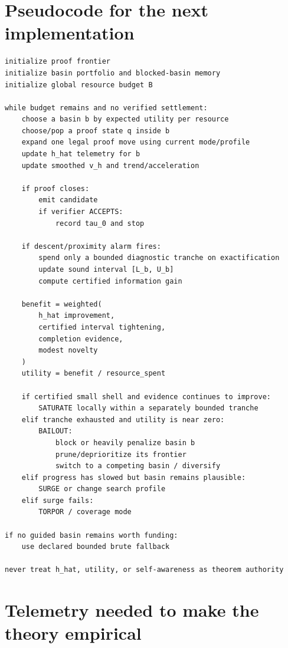 \documentclass[11pt]{article}
\begin{document}
\section{Pseudocode for the next implementation}

\begin{lstlisting}
initialize proof frontier
initialize basin portfolio and blocked-basin memory
initialize global resource budget B

while budget remains and no verified settlement:
    choose a basin b by expected utility per resource
    choose/pop a proof state q inside b
    expand one legal proof move using current mode/profile
    update h_hat telemetry for b
    update smoothed v_h and trend/acceleration

    if proof closes:
        emit candidate
        if verifier ACCEPTS:
            record tau_0 and stop

    if descent/proximity alarm fires:
        spend only a bounded diagnostic tranche on exactification
        update sound interval [L_b, U_b]
        compute certified information gain

    benefit = weighted(
        h_hat improvement,
        certified interval tightening,
        completion evidence,
        modest novelty
    )
    utility = benefit / resource_spent

    if certified small shell and evidence continues to improve:
        SATURATE locally within a separately bounded tranche
    elif tranche exhausted and utility is near zero:
        BAILOUT:
            block or heavily penalize basin b
            prune/deprioritize its frontier
            switch to a competing basin / diversify
    elif progress has slowed but basin remains plausible:
        SURGE or change search profile
    elif surge fails:
        TORPOR / coverage mode

if no guided basin remains worth funding:
    use declared bounded brute fallback

never treat h_hat, utility, or self-awareness as theorem authority
\end{lstlisting}

\section{Telemetry needed to make the theory empirical}
\end{document}
